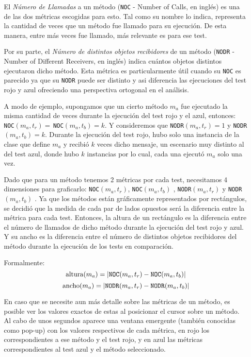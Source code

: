 \par El \emph{Número de Llamadas} a un método ({\tt NOC} - Number of Calls, en inglés) es una de las dos métricas escogidas para esto. Tal como su nombre lo indica, representa la cantidad de veces que un método fue llamado para su ejecución. De esta manera, entre más veces fue llamado, más relevante es para ese test.

\par Por su parte, el \emph{Número de distintos objetos recibidores} de un método ({\tt NODR} - Number of Different Receivers, en inglés) indica cuántos objetos distintos ejecutaron dicho método. Esta métrica es particularmente útil cuando su {\tt NOC} es parecido ya que su {\tt NODR} puede ser distinto y asi diferencia las ejecuciones del test rojo y azul ofreciendo una perspectiva ortogonal en el análisis.

\par A modo de ejemplo, supongamos que un cierto método $m_a$ fue ejecutado la misma cantidad de veces durante la ejecución del test rojo y el azul, entonces: {\tt NOC}$(m_a,t_r) = \,${\tt NOC}$(m_a,t_b) = k$. Y consideremos que {\tt NODR}$(m_a,t_r) = 1$ y {\tt NODR}$(m_a,t_b) = k$. Durante la ejecución del test rojo, hubo solo una instancia de la clase que define $m_a$ y recibió $k$ veces dicho mensaje, un escenario muy distinto al del test azul, donde hubo $k$ instancias por lo cual, cada una ejecutó $m_a$ solo una vez.

\par Dado que para un método tenemos 2 métricas por cada test, necesitamos 4 dimensiones para graficarlo: {\tt NOC}$(m_a,t_r)$, {\tt NOC}$(m_a,t_b)$ , {\tt NODR}$(m_a,t_r)$ y {\tt NODR}$(m_a,t_b)$ . Ya que los métodos están gráficamente representados por rectángulos, se decidió que la medida de cada par de lados opuestos será la diferencia entre la métrica para cada test. Entonces, la altura de un rectángulo es la diferencia entre el número de llamados de dicho método durante la ejecución del test rojo y azul. Y su ancho es la diferencia entre el número de distintos objetos recibidores del método durante la ejecución de los tests en comparación. 

\par Formalmente:
\[ {\rm altura}(m_a) = \vert {\tt NOC}(m_a,t_r) - {\tt NOC}(m_a,t_b) \vert \]
\[ {\rm ancho}(m_a) = \vert {\tt NODR}(m_a,t_r) - {\tt NODR}(m_a,t_b) \vert \]


\par En caso que se necesite aun más detalle sobre las métricas de un método, es posible ver los valores exactos de estas al posicionar el cursor sobre un método. Al cabo de unos segundos aparece una ventana emergente (también conocidas como pop-up) con los valores respectivos de cada métrica, en rojo los correspondientes a ese método y el test rojo, y en azul las métricas correspondientes al test azul y el método seleccionado.


